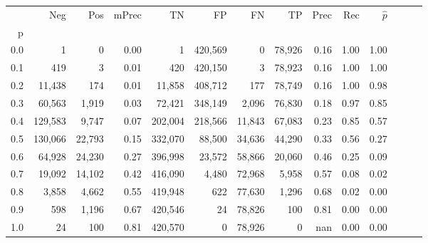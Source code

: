 \begin{tabular}{rrrrrrrrrrrrrr}
\toprule
{} &      Neg &     Pos & mPrec &       TN &       FP &      FN &      TP &  Prec &   Rec & $\hat{p}$ \\
p   &          &         &       &          &          &         &         &       &       &           \\
\midrule
0.0 &        1 &       0 &  0.00 &        1 &  420,569 &       0 &  78,926 &  0.16 &  1.00 &      1.00 \\
0.1 &      419 &       3 &  0.01 &      420 &  420,150 &       3 &  78,923 &  0.16 &  1.00 &      1.00 \\
0.2 &   11,438 &     174 &  0.01 &   11,858 &  408,712 &     177 &  78,749 &  0.16 &  1.00 &      0.98 \\
0.3 &   60,563 &   1,919 &  0.03 &   72,421 &  348,149 &   2,096 &  76,830 &  0.18 &  0.97 &      0.85 \\
0.4 &  129,583 &   9,747 &  0.07 &  202,004 &  218,566 &  11,843 &  67,083 &  0.23 &  0.85 &      0.57 \\
0.5 &  130,066 &  22,793 &  0.15 &  332,070 &   88,500 &  34,636 &  44,290 &  0.33 &  0.56 &      0.27 \\
0.6 &   64,928 &  24,230 &  0.27 &  396,998 &   23,572 &  58,866 &  20,060 &  0.46 &  0.25 &      0.09 \\
0.7 &   19,092 &  14,102 &  0.42 &  416,090 &    4,480 &  72,968 &   5,958 &  0.57 &  0.08 &      0.02 \\
0.8 &    3,858 &   4,662 &  0.55 &  419,948 &      622 &  77,630 &   1,296 &  0.68 &  0.02 &      0.00 \\
0.9 &      598 &   1,196 &  0.67 &  420,546 &       24 &  78,826 &     100 &  0.81 &  0.00 &      0.00 \\
1.0 &       24 &     100 &  0.81 &  420,570 &        0 &  78,926 &       0 &   nan &  0.00 &      0.00 \\
\bottomrule
\end{tabular}
